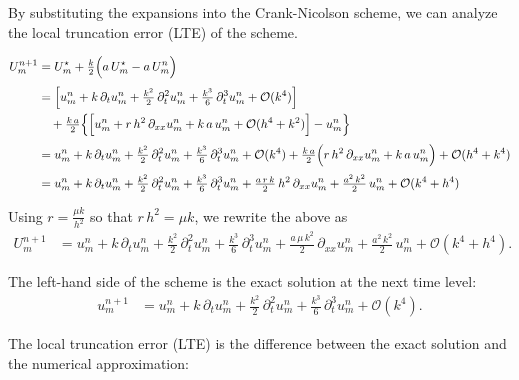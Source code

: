 By substituting the expansions into the Crank-Nicolson scheme, we can analyze the local truncation error (LTE) of the scheme.

\begin{align*}
  U_m^{n+1} & = U_m^\star + \tfrac{k}{2} \Bigl( a\,U_m^\star - a\,U_m^n \Bigr)                                                                            \\[1mm]
            & = \Bigl[ u_m^n + k\,\partial_t u_m^n + \tfrac{k^2}{2}\,\partial_t^2 u_m^n + \tfrac{k^3}{6}\,\partial_t^3 u_m^n + \mathcal{O}(k^4) \Bigr]    \\
            & \quad {}+ \tfrac{k\,a}{2}\Bigl\{ \Bigl[ u_m^n + r\,h^2\,\partial_{xx} u_m^n + k\,a\,u_m^n
  + \mathcal{O}(h^4+k^2) \Bigr] - u_m^n \Bigr\}                                                                                                           \\[1mm]
            & = u_m^n + k\,\partial_t u_m^n + \tfrac{k^2}{2}\,\partial_t^2 u_m^n
  + \tfrac{k^3}{6}\,\partial_t^3 u_m^n + \mathcal{O}(k^4) + \tfrac{k\,a}{2}\Bigl( r\,h^2\,\partial_{xx} u_m^n + k\,a\,u_m^n \Bigr) + \mathcal{O}(h^4+k^4) \\[1mm]
            & = u_m^n + k\,\partial_t u_m^n + \tfrac{k^2}{2}\,\partial_t^2 u_m^n
  + \tfrac{k^3}{6}\,\partial_t^3 u_m^n
  + \tfrac{a\,r\,k}{2}\,h^2\,\partial_{xx} u_m^n + \tfrac{a^2\,k^2}{2}\,u_m^n
  + \mathcal{O}(k^4+h^4)
\end{align*}

Using \(r=\frac{\mu k}{h^2}\) so that \(r\,h^2=\mu k\), we rewrite the above as
\begin{align*}
  U_m^{n+1} & = u_m^n + k\,\partial_t u_m^n + \tfrac{k^2}{2}\,\partial_t^2 u_m^n
  + \tfrac{k^3}{6}\,\partial_t^3 u_m^n
  + \tfrac{a\,\mu\,k^2}{2}\,\partial_{xx} u_m^n + \tfrac{a^2\,k^2}{2}\,u_m^n
  + \mathcal{O}(k^4+h^4).
\end{align*}

The left-hand side of the scheme is the exact solution at the next time level:
\begin{align*}
  u_m^{n+1}
   & = u_m^n + k\,\partial_t u_m^n + \tfrac{k^2}{2}\,\partial_t^2 u_m^n
  + \tfrac{k^3}{6}\,\partial_t^3 u_m^n + \mathcal{O}(k^4).
\end{align*}

The local truncation error (LTE) is the difference between the exact solution and the numerical approximation:

